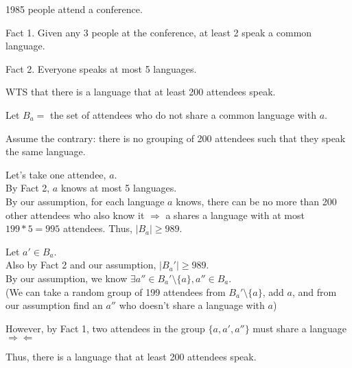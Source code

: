 \documentclass[fleqn]{article}
\begin{document}
1985 people attend a conference.

Fact 1. Given any 3 people at the conference, 
at least 2 speak a common language.

Fact 2. Everyone speaks at most 5 languages.

WTS that there is a language that at least 200 attendees speak.

Let $B_a = $ the set of attendees who do not share a common language with $a$.

Assume the contrary: there is no grouping of 200 attendees such that they speak the same language.

Let's take one attendee, $a$.\\
By Fact 2, $a$ knows at most 5 languages.\\
By our assumption, for each language $a$ knows, there can be no more than 200 other attendees who also know it $\Rightarrow$ a shares a language with at most $199*5=995$ attendees. Thus, $|B_a| \geq 989$.

Let $a' \in B_a$.\\
Also by Fact 2 and our assumption, $|B_a'| \geq 989$.\\
By our assumption, we know 
$\exists a'' \in B_a' \setminus \lbrace a \rbrace, a'' \in B_a$.\\
(We can take a random group of 199 attendees from $B_a' \setminus \lbrace a \rbrace$, add $a$, and from our assumption find an $a''$ who doesn't share a language with $a$)

However, by Fact 1, two attendees in the group 
$\lbrace a, a', a'' \rbrace$ must share a language 
$\Rightarrow \Leftarrow$

Thus, there is a language that at least 200 attendees speak.
\end{document}
